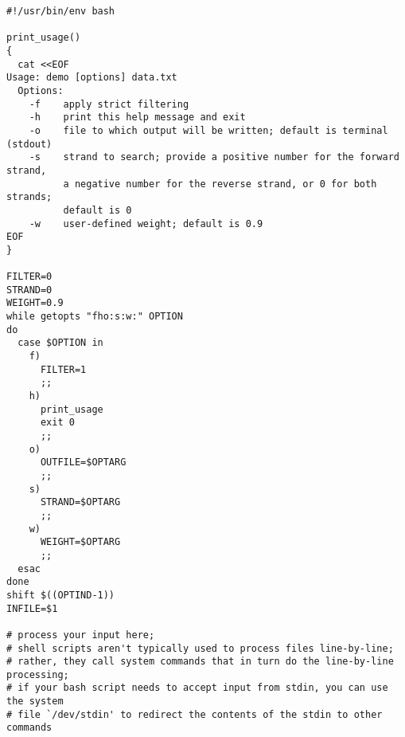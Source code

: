 \documentclass{article}
\begin{document}
\begin{verbatim}
#!/usr/bin/env bash

print_usage()
{
  cat <<EOF
Usage: demo [options] data.txt
  Options:
    -f    apply strict filtering
    -h    print this help message and exit
    -o    file to which output will be written; default is terminal (stdout)
    -s    strand to search; provide a positive number for the forward strand,
          a negative number for the reverse strand, or 0 for both strands;
          default is 0
    -w    user-defined weight; default is 0.9
EOF
}

FILTER=0
STRAND=0
WEIGHT=0.9
while getopts "fho:s:w:" OPTION
do
  case $OPTION in
    f)
      FILTER=1
      ;;
    h)
      print_usage
      exit 0
      ;;
    o)
      OUTFILE=$OPTARG
      ;;
    s)
      STRAND=$OPTARG
      ;;
    w)
      WEIGHT=$OPTARG
      ;;
  esac
done
shift $((OPTIND-1))
INFILE=$1

# process your input here;
# shell scripts aren't typically used to process files line-by-line;
# rather, they call system commands that in turn do the line-by-line processing;
# if your bash script needs to accept input from stdin, you can use the system
# file `/dev/stdin' to redirect the contents of the stdin to other commands
\end{verbatim}
\end{document}
